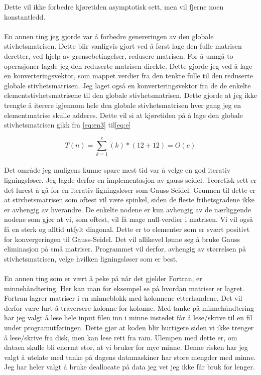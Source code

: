 \documentclass[10pt,a4paper, norsk]{article}
\begin{document}
Dette vil ikke forbedre kjøretiden asymptotisk sett, men vil fjerne noen konstantledd.

\paragraph*{}
En annen ting jeg gjorde var å forbedre genereringen av den globale stivhetsmatrisen. Dette blir vanligvis gjort ved å først lage den fulle matrisen deretter, ved hjelp av grensebetingelser, redusere matrisen. For å unngå to operasjoner lagde jeg den reduserte matrisen direkte. Dette gjorde jeg ved å lage en konverteringsvektor, som mappet verdier fra den tenkte fulle til den reduserte globale stivhetsmatrisen. Jeg laget også en konverteringsvektor fra de de enkelte elementstivhetsmatrisene til den globale stivhetsmatrisen. Dette gjorde at jeg ikke trengte å iterere igjennom hele den globale stivhetsmatrisen hver gang jeg en elementmatrise skulle adderes. Dette vil si at kjøretiden på å lage den globale stivhetsmatrisen gikk fra \eqref{eq:en3} til\eqref{eq:e}

\begin{equation} \label{eq:e}
T(n) = \sum_{k=1}^{e} (k)*(12+12)= O(e)
\end{equation}  

\paragraph*{}
Det område jeg muligens kunne spare mest tid var å velge en god iterativ ligningsløser. Jeg lagde derfor en implementasjon av gauss-seidel. Teoretisk sett er det lurest å gå for en iterativ ligningsløser som Gauss-Seidel. Grunnen til dette er at stivhetsmatrisen som oftest vil være spinkel, siden de fleste frihetsgradene ikke er avhengig av hverandre. De enkelte nodene er kun avhengig av de nærliggende nodene som gjør at vi, som oftest, vil få mage null-verdier i matrisen. Vi vil også få en sterk og alltid utfylt diagonal. Dette er to elementer som er svært positivt for konvergeringen til Gauss-Seidel. Det vil allikevel lønne seg å bruke Gauss eliminasjon på små matriser. Programmet vil derfor, avhengig av størrelsen på stivhetsmatrisen, velge hvilken ligningsløser som er best. 

\paragraph*{}
En annen ting som er vært å peke på når det gjelder Fortran, er minnehåndtering. Her kan man for eksempel se på hvordan matriser er lagret. Fortran lagrer matriser i en minneblokk med kolonnene etterhandene. Det vil derfor være lurt å traversere kolonne for kolonne.
 Med tanke på minnehåndtering har jeg valgt å lese hele input filen inn i minne instedet får å lese/skrive til en fil under programutføringen. Dette gjør at koden blir hurtigere siden vi ikke trenger å lese/skrive fra disk, men kan lese rett fra ram. Ulempen med dette er, om dataen skulle bli enormt stor, at vi bruker for mye minne. Denne risken har jeg valgt å utelate med tanke på dagens datamaskiner har store mengder med minne. Jeg har heler valgt å bruke deallocate på data jeg vet jeg ikke får bruk for lenger.
\end{document}

